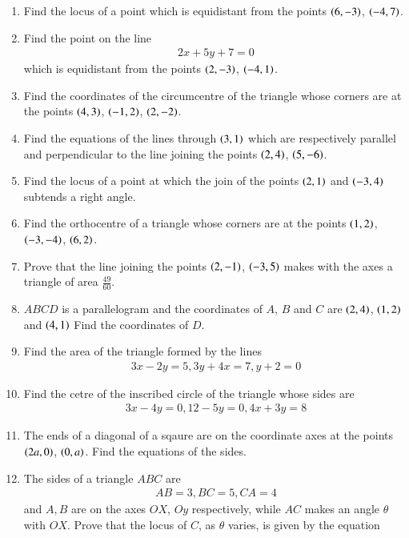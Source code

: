\begin{enumerate}[1.]
\item Find the locus of a point which is equidistant from the points $\left(6,-3\right)$, $\left(-4,7\right)$.
\item Find the point on the line
\begin{align*}
2x+5y+7=0
\end{align*}
which is equidistant from the points $\left(2,-3\right)$, $\left(-4,1\right)$.
\item Find the coordinates of the circumcentre of the triangle whose corners are at the points $\left(4,3\right)$, $\left(-1,2\right)$, $\left(2,-2\right)$.
\item Find the equations of the lines through $\left(3,1\right)$ which are respectively parallel and perpendicular to the line joining the points $\left(2,4\right)$, $\left(5,-6\right)$.
\item Find the locus of a point at which the join of the points $\left(2,1\right)$ and $\left(-3,4\right)$ subtends a right angle.
\item Find the orthocentre of a triangle whose corners are at the points $\left(1,2\right)$, $\left(-3,-4\right)$, $\left(6,2\right)$.
\item Prove that the line joining the points $\left(2,-1\right)$, $\left(-3,5\right)$ makes with the axes a triangle of area $\frac{49}{60}$.
\item $ABCD$ is a parallelogram and the coordinates of $A$, $B$ and $C$ are $\left(2,4\right)$, $\left(1,2\right)$ and $\left(4,1\right)$ Find the coordinates of $D$.
\item Find the area of the triangle formed by the lines 
\begin{align*}
3x-2y=5, 3y+4x=7, y +2 = 0
\end{align*}
\item Find the cetre of the inscribed circle of the triangle whose sides are
\begin{align*}
3x-4y=0, 12-5y=0, 4x+3y=8
\end{align*}
\item The ends of a diagonal of a sqaure are on the coordinate axes at the points $\left(2a,0\right)$, $\left(0,a\right)$.  Find the equations of the sides.
\item The sides of a triangle $ABC$ are
\begin{align*}
AB=3, BC = 5, CA = 4
\end{align*}
and $A, B$ are on the axes $OX$, $Oy$ respectively, while $AC$ makes an angle $\theta$ with $OX$.  Prove that the locus of $C$, as $\theta$ varies, is given by the equation
\begin{align*}

\end{align*}
\end{enumerate}
